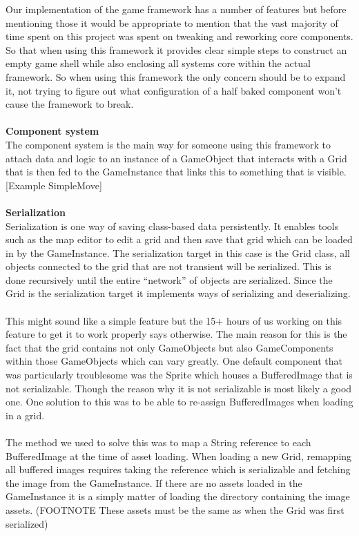 \documentclass[main.tex]{subfiles}
\begin{document}
Our implementation of the game framework has a number of features but before mentioning those it would be appropriate to mention that the vast majority of time spent on this project was spent on tweaking and reworking core components. So that when using this framework it provides clear simple steps to construct an empty game shell while also enclosing all systems core within the actual framework. So when using this framework the only concern should be to expand it, not trying to figure out what configuration of a half baked component won’t cause the framework to break.
\\ \\
\textbf{Component system} \\%
The component system is the main way for someone using this framework to attach data and logic to an instance of a GameObject that interacts with a Grid that is then fed to the GameInstance that links this to something that is visible.
[Example SimpleMove]
\\ \\
\textbf{Serialization} \\%
Serialization is one way of saving class-based data persistently. It enables tools such as the map editor to edit a grid and then save that grid which can be loaded in by the GameInstance. The serialization target in this case is the Grid class, all objects connected to the grid that are not transient will be serialized. This is done recursively until the entire “network” of objects are serialized. Since the Grid is the serialization target it implements ways of serializing and deserializing. 
\\ \\
This might sound like a simple feature but the 15+ hours of us working on this feature to get it to work properly says otherwise. The main reason for this is the fact that the grid contains not only GameObjects but also GameComponents within those GameObjects which can vary greatly. One default component that was particularly troublesome was the Sprite which houses a BufferedImage that is not serializable. Though the reason why it is not serializable is most likely a good one. One solution to this was to be able to re-assign BufferedImages when loading in a grid. 
\\ \\
The method we used to solve this was to map a String reference to each BufferedImage at the time of asset loading. When loading a new Grid, remapping all buffered images requires taking the reference which is serializable and fetching the image from the GameInstance. If there are no assets loaded in the GameInstance it is a simply matter of loading the directory containing the image assets. (FOOTNOTE These assets must be the same as when the Grid was first serialized)
\end{document}
